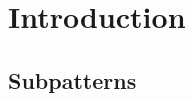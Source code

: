 \section{Introduction}
\label{sec:Introduction}
\subsection{Subpatterns}
\label{sub:Subpatterns}

%
%
%
%
%
